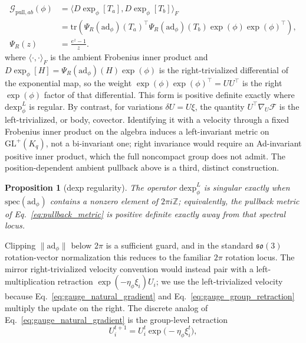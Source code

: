\documentclass[11pt]{article}
\newtheorem{proposition}{Proposition}
\begin{document}
\begin{equation}
\begin{aligned}
\mathcal{G}_{\mathrm{pull},ab}(\phi)
&= \langle D\exp_\phi[T_a], D\exp_\phi[T_b] \rangle_F \\
&= \mathrm{tr}\left(
\Psi_R(\mathrm{ad}_\phi)(T_a)^\top
\Psi_R(\mathrm{ad}_\phi)(T_b)
\exp(\phi)\exp(\phi)^\top
\right), \\
\Psi_R(z) &= \frac{e^{z} - 1}{z}.
\end{aligned}
\label{eq:pullback_metric}
\end{equation}
where $\langle\cdot,\cdot\rangle_F$ is the ambient Frobenius inner product and $D\exp_\phi[H] = \Psi_R(\mathrm{ad}_\phi)(H)\exp(\phi)$ is the right-trivialized differential of the exponential map, so the weight $\exp(\phi)\exp(\phi)^\top = UU^\top$ is the right $\exp(\phi)$ factor of that differential. This form is positive definite exactly where $\mathrm{dexp}^{L}_\phi$ is regular. By contrast, for variations $\delta U=U\xi$, the quantity $U^\top\nabla_U\mathcal{F}$ is the left-trivialized, or body, covector. Identifying it with a velocity through a fixed Frobenius inner product on the algebra induces a left-invariant metric on $\mathrm{GL}^+(K_q)$, not a bi-invariant one; right invariance would require an Ad-invariant positive inner product, which the full noncompact group does not admit. The position-dependent ambient pullback above is a third, distinct construction.
\begin{proposition}[dexp regularity]\label{prop:dexp_regularity}
The operator $\mathrm{dexp}^{L}_\phi$ is singular exactly when $\mathrm{spec}(\mathrm{ad}_\phi)$ contains a nonzero element of $2\pi i\mathbb{Z}$; equivalently, the pullback metric of Eq.~\eqref{eq:pullback_metric} is positive definite exactly away from that spectral locus.
\end{proposition}
Clipping $\|\mathrm{ad}_\phi\|$ below $2\pi$ is a sufficient guard, and in the standard $\mathfrak{so}(3)$ rotation-vector normalization this reduces to the familiar $2\pi$ rotation locus. The mirror right-trivialized velocity convention would instead pair with a left-multiplication retraction $\exp(-\eta_\phi\xi_i)U_i$; we use the left-trivialized velocity because Eq.~\eqref{eq:gauge_natural_gradient} and Eq.~\eqref{eq:gauge_group_retraction} multiply the update on the right. The discrete analog of Eq.~\eqref{eq:gauge_natural_gradient} is the group-level retraction
\begin{equation}
U_i^{t+1} = U_i^t \exp\big(-\eta_\phi \xi_i^t\big),
\label{eq:gauge_group_retraction}
\end{equation}
\end{document}
